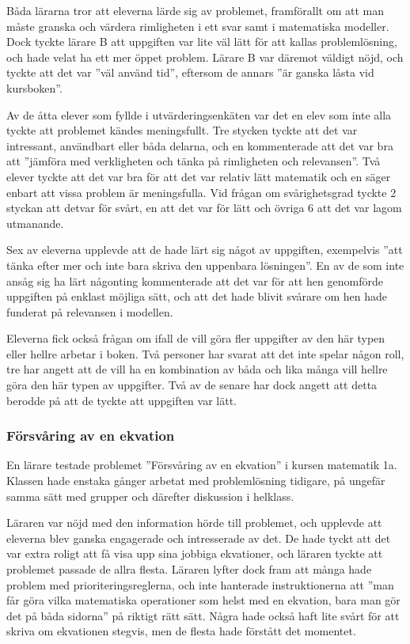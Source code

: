         \textcolor{lila}{Båda lärarna tror att eleverna lärde sig av problemet, framförallt om att man måste granska och värdera rimligheten i ett svar samt i matematiska modeller. Dock tyckte lärare B att uppgiften var lite väl lätt för att kallas problemlösning, och hade velat ha ett mer öppet problem. Lärare B var däremot väldigt nöjd, och tyckte att det var ''väl använd tid'', eftersom de annars ''är ganska låsta vid kursboken''.}
    
        \textcolor{lila}{Av de åtta elever som fyllde i utvärderingsenkäten var det en elev som inte alla tyckte att problemet kändes meningsfullt. Tre stycken tyckte att det var intressant, användbart eller båda delarna, och en kommenterade att det var bra att ''jämföra med verkligheten och tänka på rimligheten och relevansen''. Två elever tyckte att det var bra för att det var relativ lätt matematik och en säger enbart att vissa problem är meningsfulla. 
        Vid frågan om svårighetsgrad tyckte 2 styckan att detvar för svårt, en att det var för lätt och övriga 6 att det var lagom utmanande.}
    
        \textcolor{lila}{Sex av eleverna upplevde att de hade lärt sig något av uppgiften, exempelvis ''att tänka efter mer och inte bara skriva den uppenbara lösningen''. En av de som inte ansåg sig ha lärt någonting kommenterade att det var för att hen genomförde uppgiften på enklast möjliga sätt, och att det hade blivit svårare om hen hade funderat på relevansen i modellen.}
    
        \textcolor{lila}{Eleverna fick också frågan om ifall de vill göra fler uppgifter av den här typen eller hellre arbetar i boken. Två personer har svarat att det inte spelar någon roll, tre har angett att de vill ha en kombination av båda och lika många vill hellre göra den här typen av uppgifter. Två av de senare har dock angett att detta berodde på att de tyckte att uppgiften var lätt.}
    
    \subsubsection{Försvåring av en ekvation}
        \textcolor{lila}{En lärare testade problemet ''Försvåring av en ekvation'' i kursen matematik 1a. Klassen hade enstaka gånger arbetat med problemlösning tidigare, på ungefär samma sätt med grupper och därefter diskussion i helklass.}
        
        \textcolor{lila}{Läraren var nöjd med den information hörde till problemet, och upplevde att eleverna blev ganska engagerade och intresserade av det. De hade tyckt att det var extra roligt att få visa upp sina jobbiga ekvationer, och läraren tyckte att problemet passade de allra flesta. Läraren lyfter dock fram att många hade problem med prioriteringsreglerna, och inte hanterade instruktionerna att ''man får göra vilka matematiska operationer som helst med en ekvation, bara man gör det på båda sidorna'' på riktigt rätt sätt. Några hade också haft lite svårt för att skriva om ekvationen stegvis, men de flesta hade förstått det momentet.}
        
